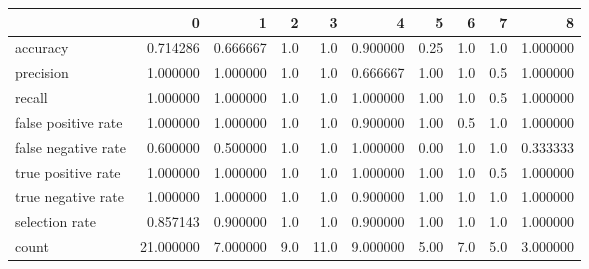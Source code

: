 \begin{tabular}{lrrrrrrrrr}
\toprule
{} &          0 &         1 &    2 &     3 &         4 &     5 &    6 &    7 &         8 \\
\midrule
accuracy            &   0.714286 &  0.666667 &  1.0 &   1.0 &  0.900000 &  0.25 &  1.0 &  1.0 &  1.000000 \\
precision           &   1.000000 &  1.000000 &  1.0 &   1.0 &  0.666667 &  1.00 &  1.0 &  0.5 &  1.000000 \\
recall              &   1.000000 &  1.000000 &  1.0 &   1.0 &  1.000000 &  1.00 &  1.0 &  0.5 &  1.000000 \\
false positive rate &   1.000000 &  1.000000 &  1.0 &   1.0 &  0.900000 &  1.00 &  0.5 &  1.0 &  1.000000 \\
false negative rate &   0.600000 &  0.500000 &  1.0 &   1.0 &  1.000000 &  0.00 &  1.0 &  1.0 &  0.333333 \\
true positive rate  &   1.000000 &  1.000000 &  1.0 &   1.0 &  1.000000 &  1.00 &  1.0 &  0.5 &  1.000000 \\
true negative rate  &   1.000000 &  1.000000 &  1.0 &   1.0 &  0.900000 &  1.00 &  1.0 &  1.0 &  1.000000 \\
selection rate      &   0.857143 &  0.900000 &  1.0 &   1.0 &  0.900000 &  1.00 &  1.0 &  1.0 &  1.000000 \\
count               &  21.000000 &  7.000000 &  9.0 &  11.0 &  9.000000 &  5.00 &  7.0 &  5.0 &  3.000000 \\
\bottomrule
\end{tabular}
